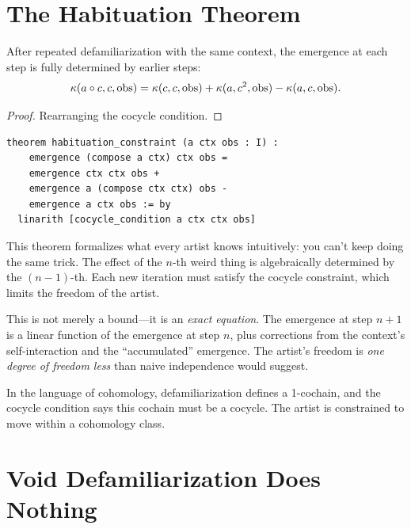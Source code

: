 \section{The Habituation Theorem}

\begin{theorem}
\label{thm:habituation}
After repeated defamiliarization with the same context, the emergence
at each step is fully determined by earlier steps:
\[
  \kappa(a \circ c, c, \mathrm{obs})
  = \kappa(c, c, \mathrm{obs}) + \kappa(a, c^2, \mathrm{obs})
    - \kappa(a, c, \mathrm{obs}).
\]
\end{theorem}

\begin{proof}
Rearranging the cocycle condition.
\end{proof}

\begin{lstlisting}
theorem habituation_constraint (a ctx obs : I) :
    emergence (compose a ctx) ctx obs =
    emergence ctx ctx obs +
    emergence a (compose ctx ctx) obs -
    emergence a ctx obs := by
  linarith [cocycle_condition a ctx ctx obs]
\end{lstlisting}

\begin{interpretation}
This theorem formalizes what every artist knows intuitively: you can't
keep doing the same trick.  The effect of the $n$-th weird thing is
algebraically determined by the $(n{-}1)$-th.  Each new iteration must
satisfy the cocycle constraint, which limits the freedom of the artist.

This is not merely a bound---it is an \emph{exact equation}.  The
emergence at step $n+1$ is a linear function of the emergence at step $n$,
plus corrections from the context's self-interaction and the
``accumulated'' emergence.  The artist's freedom is \emph{one degree of
freedom less} than naive independence would suggest.

In the language of cohomology, defamiliarization defines a 1-cochain,
and the cocycle condition says this cochain must be a cocycle.  The
artist is constrained to move within a cohomology class.
\end{interpretation}

\section{Void Defamiliarization Does Nothing}

